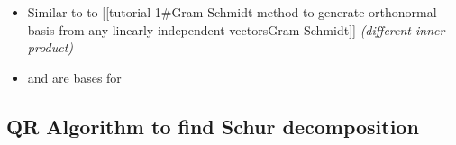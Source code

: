 \begin{itemize}
\begin{itemize}
    \begin{itemize}
    
    \item
      Similar to to {[}{[}tutorial 1\#Gram-Schmidt method to generate
      orthonormal basis from any linearly independent
      vectors\textbar Gram-Schmidt{]}{]} \emph{(different
      inner-product)}
    \item
      and
      are bases for 
    \end{itemize}
  \end{itemize}
\end{itemize}

\subsection*{\texorpdfstring{QR Algorithm to find Schur decomposition
}{QR Algorithm to find Schur decomposition }}

